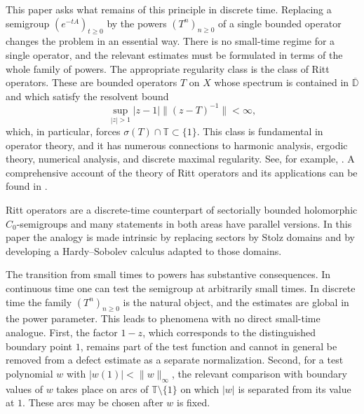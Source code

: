 \documentclass[11pt]{amsart}
\numberwithin{equation}{section}
\theoremstyle{definition}
\theoremstyle{plain}
\def\T{\mathbb{T}}
\begin{document}
This paper asks what remains of this principle in discrete time. Replacing a
semigroup $(e^{-tA})_{t\ge0}$ by the powers $(T^n)_{n\ge0}$ of a single bounded
operator changes the problem in an essential way. There is no small-time
regime for a single operator, and the relevant estimates must be formulated in
terms of the whole family of powers. 
The appropriate regularity class is the class of Ritt operators.  These are
bounded operators $T$ on $X$ whose spectrum is contained in \(\overline{\mathbb D}\)
and which satisfy the resolvent bound
\[
        \sup_{|z|>1}|z-1|\|(z-T)^{-1}\|<\infty,
\]
which, in particular, forces \(\sigma(T)\cap\mathbb T\subset\{1\}\).
 This class is fundamental in operator theory, and it has numerous
connections to harmonic analysis, ergodic theory, numerical analysis, and discrete maximal regularity. 
See, for example, \cite{Badea-Seifert,Blunck1,Blunck2,Cohen-Cuny-Lin, Coulhon-SaloffCoste,Cuny,ElFallah-Ransford,Hults-ReinholdLarsson,Kalton-Portal,Nevanlinna}.
A comprehensive account of the theory of Ritt operators and its
applications can be found in \cite{LeMerdy}.

 
Ritt operators are a discrete-time counterpart of 
sectorially bounded holomorphic \(C_0\)-semigroups
and many statements in both areas have parallel versions.
In this paper the analogy is
made intrinsic by replacing sectors by Stolz domains and by developing a
Hardy--Sobolev calculus adapted to those domains.

The transition from small times to powers has substantive consequences. In continuous
time one can test the semigroup at arbitrarily small times. In discrete time the family
$(T^n)_{n\ge0}$ is the natural object, and the estimates are global in the
power parameter. This leads to phenomena with no direct small-time analogue. First, the factor
$1-z$, which corresponds to the distinguished boundary point $1$, remains part
of the test function and cannot in general be removed from a defect estimate as
a separate normalization. Second, for a test polynomial $w$ with
$|w(1)|<\|w\|_\infty$, the relevant comparison with boundary values of
$w$ takes place on arcs of $\mathbb T\setminus\{1\}$
 on which $|w|$ is separated from
its value at $1$. These arcs may be chosen after $w$ is fixed.
\end{document}
